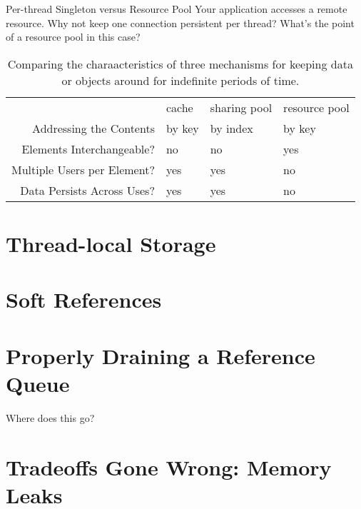 \begin{example}{Per-thread Singleton versus Resource Pool}
Your application accesses a remote resource. Why not keep one connection
persistent per thread? What's the point of a resource pool in this case?
\end{example}



\begin{table}
	\centering
	\begin{tabular}{rlll} \toprule
            & cache             & sharing pool & resource pool 
    \\ \cmidrule{2-4}
    Addressing the Contents     & by key       & by index & by key
    \\
        Elements Interchangeable?   & no    & no    & yes
    \\
    Multiple Users per Element? & yes   & yes   & no
    \\
    Data Persists Across Uses?  & yes   & yes   & no
    \\ \bottomrule
    \end{tabular}
	\caption{Comparing the charaacteristics of three mechanisms for keeping data
	or objects around for indefinite periods of time.}
	\label{tab:three-deferred-deletions}
\end{table}




\section{Thread-local Storage}

\section{Soft References}

\section{Properly Draining a Reference Queue}
Where does this go?

\section{Tradeoffs Gone Wrong: Memory Leaks}

